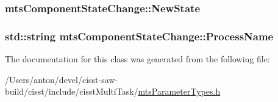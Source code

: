 \subsubsection[{New\+State}]{ mts\+Component\+State\+Change\+::\+New\+State}\label{classmts_component_state_change_ae3abdb4b20508af94c78c01168d1cf0e}
\hypertarget{classmts_component_state_change_a47784c0fa820ca6789fc02049eb6f795}{}
\subsubsection[{Process\+Name}]{\setlength{\rightskip}{0pt plus 5cm}std\+::string mts\+Component\+State\+Change\+::\+Process\+Name}\label{classmts_component_state_change_a47784c0fa820ca6789fc02049eb6f795}


The documentation for this class was generated from the following file\+:\begin{DoxyCompactItemize}
\item 
/\+Users/anton/devel/cisst-\/saw-\/build/cisst/include/cisst\+Multi\+Task/\hyperlink{mts_parameter_types_8h}{mts\+Parameter\+Types.\+h}\end{DoxyCompactItemize}
